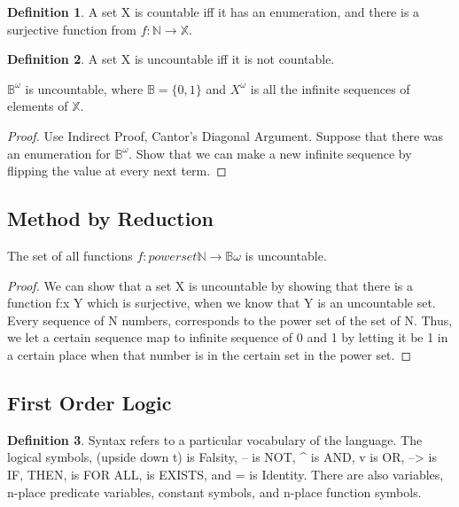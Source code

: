 \documentclass[11pt]{article}
\theoremstyle{plain} %
\theoremstyle{definition}
\newtheorem*{definition}{Definition} %
\theoremstyle{example}
\theoremstyle{remark}
\begin{document}
\begin{definition}
A set X is countable iff it has an enumeration, and there is a surjective function from $f: \mathbb N \to \mathbb X$.
\end{definition}


\begin{definition}
A set X is uncountable iff it is not countable.
\end{definition}


\begin{Theorem}

$\mathbb B^\omega$ is uncountable, where $\mathbb B = \{0,1\}$ and $X^\omega$ is all the infinite sequences of elements of $\mathbb X$.
\end{Theorem}

\begin{proof}
Use Indirect Proof, Cantor's Diagonal Argument.
Suppose that there was an enumeration for $\mathbb B^\omega$. Show that we can make a new infinite sequence by flipping the value at every next term. 
\end{proof}

\subsection{Method by Reduction}

\begin{Proposition}
The set of all functions $f: powerset \mathbb N \to \mathbb B\omega$ is uncountable. 
\end{Proposition}

\begin{proof}
We can show that a set X is uncountable by showing that there is a function f:x \to Y which is surjective, when we know that Y is an uncountable set. Every sequence of N numbers, corresponds to the power set of the set of N. Thus, we let a certain sequence map to infinite sequence of 0 and 1 by letting it be 1 in a certain place when that number is in the certain set in the power set. 
\end{proof}

\subsection{First Order Logic}
\begin{definition}
Syntax refers to a particular vocabulary of the language. The logical symbols, (upside down t) is Falsity, -- is NOT, ^ is AND, v is OR, --> is IF, THEN, \forall is FOR ALL, \exists is EXISTS, and = is Identity. There are also variables, n-place predicate variables, constant symbols, and n-place function symbols.
\end{definition}
\end{document}
